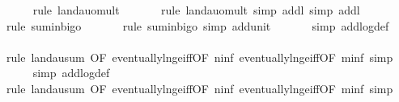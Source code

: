 \begin{isabellebody}
\ \ \ \ \isamarkupfalse%
\ {\isacharparenleft}{\kern0pt}rule\ landau{\isacharunderscore}{\kern0pt}o{\isachardot}{\kern0pt}mult{\isacharparenright}{\kern0pt}\isanewline
\ \ \ \ \ \isamarkupfalse%
\ {\isacharparenleft}{\kern0pt}rule\ landau{\isacharunderscore}{\kern0pt}o{\isachardot}{\kern0pt}mult{\isacharcomma}{\kern0pt}\ simp\ add{\isacharcolon}{\kern0pt}l{}{\isacharcomma}{\kern0pt}\ simp\ add{\isacharcolon}{\kern0pt}l{}{\isacharparenright}{\kern0pt}\isanewline
\ \ \ \ \isamarkupfalse%
\ {\isacharparenleft}{\kern0pt}rule\ sum{\isacharunderscore}{\kern0pt}in{\isacharunderscore}{\kern0pt}bigo{\isacharparenright}{\kern0pt}\isanewline
\ \ \ \ \ \isamarkupfalse%
\ {\isacharparenleft}{\kern0pt}rule\ sum{\isacharunderscore}{\kern0pt}in{\isacharunderscore}{\kern0pt}bigo{\isacharcomma}{\kern0pt}\ simp\ add{\isacharcolon}{\kern0pt}unit{\isacharunderscore}{\kern0pt}{}{\isacharparenright}{\kern0pt}\isanewline
\ \ \ \ \ \isamarkupfalse%
\ {\isacharparenleft}{\kern0pt}simp\ add{\isacharcolon}{\kern0pt}log{\isacharunderscore}{\kern0pt}def{\isacharparenright}{\kern0pt}\isanewline
\ \ \ \ \isamarkupfalse%
\ {\isacharparenleft}{\kern0pt}rule\ landau{\isacharunderscore}{\kern0pt}sum{\isacharunderscore}{\kern0pt}{}\ {\isacharbrackleft}{\kern0pt}OF\ eventually{\isacharunderscore}{\kern0pt}ln{\isacharunderscore}{\kern0pt}ge{\isacharunderscore}{\kern0pt}iff{\isacharbrackleft}{\kern0pt}OF\ n{\isacharunderscore}{\kern0pt}inf{\isacharbrackright}{\kern0pt}\ eventually{\isacharunderscore}{\kern0pt}ln{\isacharunderscore}{\kern0pt}ge{\isacharunderscore}{\kern0pt}iff{\isacharbrackleft}{\kern0pt}OF\ m{\isacharunderscore}{\kern0pt}inf{\isacharbrackright}{\kern0pt}{\isacharbrackright}{\kern0pt}{\isacharcomma}{\kern0pt}\ simp{\isacharparenright}{\kern0pt}\isanewline
\ \ \ \ \isamarkupfalse%
\ {\isacharparenleft}{\kern0pt}simp\ add{\isacharcolon}{\kern0pt}log{\isacharunderscore}{\kern0pt}def{\isacharparenright}{\kern0pt}\isanewline
\ \ \ \ \isamarkupfalse%
\ {\isacharparenleft}{\kern0pt}rule\ landau{\isacharunderscore}{\kern0pt}sum{\isacharunderscore}{\kern0pt}{}\ {\isacharbrackleft}{\kern0pt}OF\ eventually{\isacharunderscore}{\kern0pt}ln{\isacharunderscore}{\kern0pt}ge{\isacharunderscore}{\kern0pt}iff{\isacharbrackleft}{\kern0pt}OF\ n{\isacharunderscore}{\kern0pt}inf{\isacharbrackright}{\kern0pt}\ eventually{\isacharunderscore}{\kern0pt}ln{\isacharunderscore}{\kern0pt}ge{\isacharunderscore}{\kern0pt}iff{\isacharbrackleft}{\kern0pt}OF\ m{\isacharunderscore}{\kern0pt}inf{\isacharbrackright}{\kern0pt}{\isacharbrackright}{\kern0pt}{\isacharcomma}{\kern0pt}\ simp{\isacharparenright}{\kern0pt}\isanewline

\end{isabellebody}
